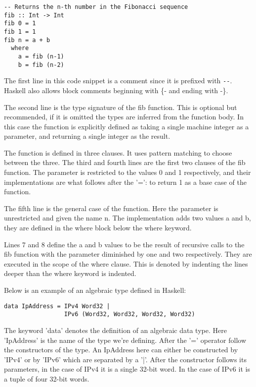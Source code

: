\begin{lstlisting}[caption={Fibonacci}]
-- Returns the n-th number in the Fibonacci sequence
fib :: Int -> Int
fib 0 = 1
fib 1 = 1
fib n = a + b
  where
    a = fib (n-1)
    b = fib (n-2)
\end{lstlisting}

The first line in this code snippet is a comment since it is prefixed with \lstinline{--}. Haskell also allows block comments beginning with \{- and ending with -\}.

The second line is the type signature of the fib function. This is optional but recommended, if it is omitted the types are inferred from the function body. In this case the function is explicitly defined as taking a single machine integer as a parameter, and returning a single integer as the result. 

The function is defined in three clauses. It uses pattern matching to choose between the three. 
The third and fourth lines are the first two clauses of the fib function. The parameter is restricted to the values 0 and 1 respectively, and their implementations are what follows after the '=': to return 1 as a base case of the function.

The fifth line is the general case of the function. Here the parameter is unrestricted and given the name n. The implementation adds two values a and b, they are defined in the where block below the where keyword.

Lines 7 and 8 define the a and b values to be the result of recursive calls to the fib function with the parameter diminished by one and two respectively. They are executed in the scope of the where clause. This is denoted by indenting the lines deeper than the where keyword is indented.

Below is an example of an algebraic type defined in Haskell:

\begin{lstlisting}[caption={IP address type}]
data IpAddress = IPv4 Word32 |
                 IPv6 (Word32, Word32, Word32, Word32)
\end{lstlisting}

The keyword 'data' denotes the definition of an algebraic data type. Here 'IpAddress' is the name of the type we're defining.
After the '=' operator follow the constructors of the type. An IpAddress here can either be constructed by 'IPv4' or by 'IPv6' which are separated by a '|'.
After the constructor follows its parameters, in the case of IPv4 it is a single 32-bit word. In the case of IPv6 it is a tuple of four 32-bit words.

